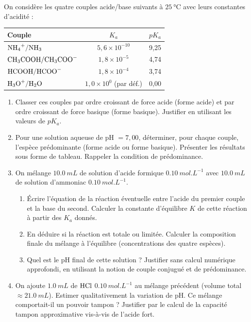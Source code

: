 \documentclass[11pt]{article}
\begin{document}
\begin{exercice}
On considère les quatre couples acide/base suivants à $\SI{25}{\celsius}$ avec leurs constantes d'acidité :
\begin{center}
\begin{tabular}{lcc}
\hline
Couple & $K_a$ & $pK_a$ \\
\hline
$\ce{NH4+}/\ce{NH3}$ & $5,6 \times 10^{-10}$ & 9,25 \\
$\ce{CH3COOH}/\ce{CH3COO-}$ & $1,8 \times 10^{-5}$ & 4,74 \\
$\ce{HCOOH}/\ce{HCOO-}$ & $1,8 \times 10^{-4}$ & 3,74 \\
$\ce{H3O+}/\ce{H2O}$ & $1,0 \times 10^{0}$ (par déf.) & 0,00 \\
\hline
\end{tabular}
\end{center}

\begin{enumerate}
    \item Classer ces couples par ordre croissant de force acide (forme acide) et par ordre croissant de force basique (forme basique). Justifier en utilisant les valeurs de $pK_a$.
    \item Pour une solution aqueuse de pH $= 7,00$, déterminer, pour chaque couple, l'espèce prédominante (forme acide ou forme basique). Présenter les résultats sous forme de tableau. Rappeler la condition de prédominance.
    \item On mélange $\SI{10.0}{mL}$ de solution d'acide formique $\SI{0.10}{mol.L^{-1}}$ avec $\SI{10.0}{mL}$ de solution d'ammoniac $\SI{0.10}{mol.L^{-1}}$.
    \begin{enumerate}
        \item Écrire l'équation de la réaction éventuelle entre l'acide du premier couple et la base du second. Calculer la constante d'équilibre $K$ de cette réaction à partir des $K_a$ donnés.
        \item En déduire si la réaction est totale ou limitée. Calculer la composition finale du mélange à l'équilibre (concentrations des quatre espèces).
        \item Quel est le pH final de cette solution ? Justifier sans calcul numérique approfondi, en utilisant la notion de couple conjugué et de prédominance.
    \end{enumerate}
    \item On ajoute $\SI{1.0}{mL}$ de $\ce{HCl}$ $\SI{0.10}{mol.L^{-1}}$ au mélange précédent (volume total $\approx \SI{21.0}{mL}$). Estimer qualitativement la variation de pH. Ce mélange comportait-il un pouvoir tampon ? Justifier par le calcul de la capacité tampon approximative vis-à-vis de l'acide fort.
\end{enumerate}
\end{exercice}
\end{document}
